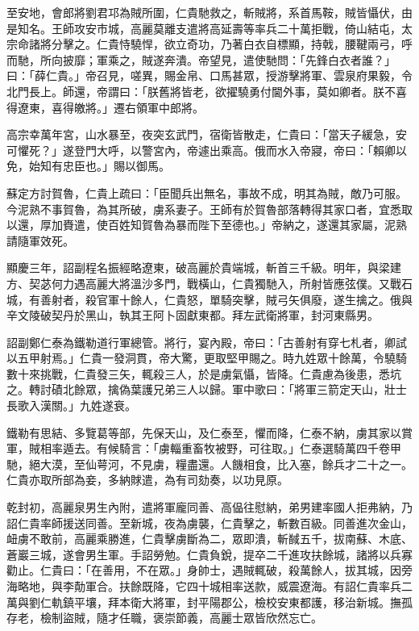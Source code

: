 \begin{pinyinscope}
 至安地，會郎將劉君邛為賊所圍，仁貴馳救之，斬賊將，系首馬鞍，賊皆懾伏，由是知名。王師攻安市城，高麗莫離支遣將高延壽等率兵二十萬拒戰，倚山結屯，太宗命諸將分擊之。仁貴恃驍悍，欲立奇功，乃著白衣自標顯，持戟，腰鞬兩弓，呼而馳，所向披靡；軍乘之，賊遂奔潰。帝望見，遣使馳問：「先鋒白衣者誰？」曰：「薛仁貴。」帝召見，嗟異，賜金帛、口馬甚眾，授游擊將軍、雲泉府果毅，令北門長上。師還，帝謂曰：「朕舊將皆老，欲擢驍勇付閫外事，莫如卿者。朕不喜得遼東，喜得皦將。」遷右領軍中郎將。



 高宗幸萬年宮，山水暴至，夜突玄武門，宿衛皆散走，仁貴曰：「當天子緩急，安可懼死？」遂登門大呼，以警宮內，帝遽出乘高。俄而水入帝寢，帝曰：「賴卿以免，始知有忠臣也。」賜以御馬。



 蘇定方討賀魯，仁貴上疏曰：「臣聞兵出無名，事故不成，明其為賊，敵乃可服。今泥熟不事賀魯，為其所破，虜系妻子。王師有於賀魯部落轉得其家口者，宜悉取以還，厚加賚遣，使百姓知賀魯為暴而陛下至德也。」帝納之，遂還其家屬，泥熟請隨軍效死。



 顯慶三年，詔副程名振經略遼東，破高麗於貴端城，斬首三千級。明年，與梁建方、契苾何力遇高麗大將溫沙多門，戰橫山，仁貴獨馳入，所射皆應弦僕。又戰石城，有善射者，殺官軍十餘人，仁貴怒，單騎突擊，賊弓矢俱廢，遂生擒之。俄與辛文陵破契丹於黑山，執其王阿卜固獻東都。拜左武衛將軍，封河東縣男。



 詔副鄭仁泰為鐵勒道行軍總管。將行，宴內殿，帝曰：「古善射有穿七札者，卿試以五甲射焉。」仁貴一發洞貫，帝大驚，更取堅甲賜之。時九姓眾十餘萬，令驍騎數十來挑戰，仁貴發三矢，輒殺三人，於是虜氣懾，皆降。仁貴慮為後患，悉坑之。轉討磧北餘眾，擒偽葉護兄弟三人以歸。軍中歌曰：「將軍三箭定天山，壯士長歌入漢關。」九姓遂衰。



 鐵勒有思結、多覽葛等部，先保天山，及仁泰至，懼而降，仁泰不納，虜其家以賞軍，賊相率遁去。有候騎言：「虜輜重畜牧被野，可往取。」仁泰選騎萬四千卷甲馳，絕大漠，至仙萼河，不見虜，糧盡還。人饑相食，比入塞，餘兵才二十之一。仁貴亦取所部為妾，多納賕遣，為有司劾奏，以功見原。



 乾封初，高麗泉男生內附，遣將軍龐同善、高偘往慰納，弟男建率國人拒弗納，乃詔仁貴率師援送同善。至新城，夜為虜襲，仁貴擊之，斬數百級。同善進次金山，衄虜不敢前，高麗乘勝進，仁貴擊虜斷為二，眾即潰，斬馘五千，拔南蘇、木底、蒼巖三城，遂會男生軍。手詔勞勉。仁貴負銳，提卒二千進攻扶餘城，諸將以兵寡勸止。仁貴曰：「在善用，不在眾。」身帥士，遇賊輒破，殺萬餘人，拔其城，因旁海略地，與李勣軍合。扶餘既降，它四十城相率送款，威震遼海。有詔仁貴率兵二萬與劉仁軌鎮平壤，拜本衛大將軍，封平陽郡公，檢校安東都護，移治新城。撫孤存老，檢制盜賊，隨才任職，褒崇節義，高麗士眾皆欣然忘亡。




\end{pinyinscope}
